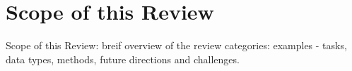 \section{Scope of this Review}
Scope of this Review: breif overview of the review categories: examples - tasks,
data types, methods, future directions and challenges.
